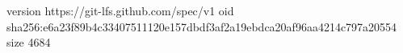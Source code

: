 version https://git-lfs.github.com/spec/v1
oid sha256:e6a23f89b4c33407511120e157dbdf3af2a19ebdca20af96aa4214c797a20554
size 4684
